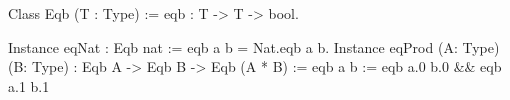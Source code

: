 \documentclass[border=2mm, varwidth]{standalone}
\begin{document}
\begin{coqcode}
Class Eqb (T : Type) := {eqb : T -> T -> bool}.

Instance eqNat : Eqb nat := {eqb a b = Nat.eqb a b}.
Instance eqProd (A: Type) (B: Type) : Eqb A -> Eqb B -> Eqb (A * B) :=
  {eqb a b := eqb a.0 b.0 && eqb a.1 b.1}
\end{coqcode}
\end{document}
